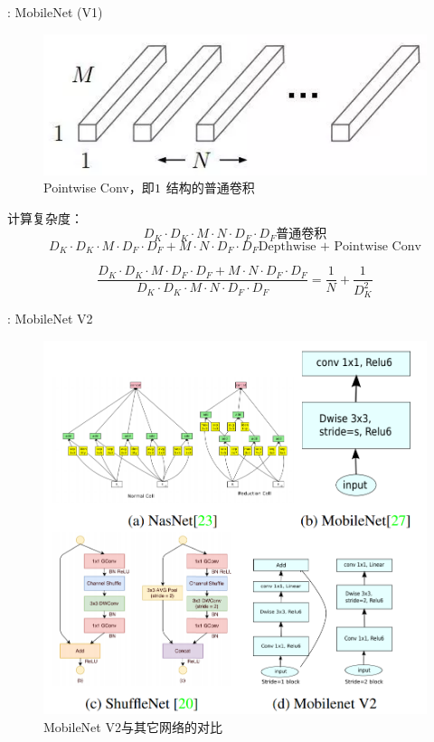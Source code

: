 \begin{frame}{\titleprefix: MobileNet (V1)}
	\begin{figure}
		\centering
		\includegraphics[width=0.5\linewidth]{Images/pointwise_1}
		\caption{Pointwise Conv，即$1\time 1$ 结构的普通卷积}
		\label{fig:pointwise1}
	\end{figure}

计算复杂度：
	\[
D_{K} \cdot D_{K} \cdot M \cdot N \cdot D_{F} \cdot D_{F}
\text{普通卷积}
\]	
\[
D_{K} \cdot D_{K} \cdot M \cdot D_{F} \cdot D_{F}+M \cdot N \cdot D_{F} \cdot D_{F}
\text{Depthwise + Pointwise Conv}
\]

\[
 \frac{D_{K} \cdot D_{K} \cdot M \cdot D_{F} \cdot D_{F}+M \cdot N \cdot D_{F} \cdot D_{F}}{D_{K} \cdot D_{K} \cdot M \cdot N \cdot D_{F} \cdot D_{F}} = \frac{1}{N}+\frac{1}{D_{K}^{2}} 
\]
\end{frame}

\begin{frame}{\titleprefix: MobileNet V2}
	\begin{figure}
		\centering
		\includegraphics[width=0.6\linewidth]{Images/mobilenetv2}
		\caption{MobileNet V2与其它网络的对比}
		\label{fig:mobilenetv2}
	\end{figure}
	
\end{frame}

